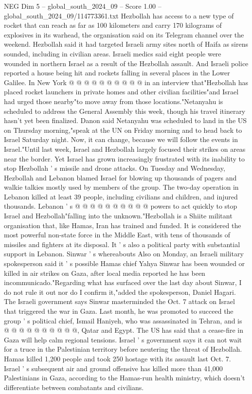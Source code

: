 \begin{textsample}{NEG Dim 5 – global\_south\_2024\_09 – Score 1.00 – global\_south\_2024\_09/114773361.txt}
Hezbollah has access to a new type of rocket that can reach as far as 100 kilometers and carry 170 kilograms of explosives in its warhead, the organisation said on its Telegram channel over the weekend.
Hezbollah said it had targeted Israeli army sites north of Haifa as sirens sounded, including in civilian areas.
Israeli medics said eight people were wounded in northern Israel as a result of the Hezbollah assault.
And Israeli police reported a house being hit and rockets falling in several places in the Lower Galilee.
In New York @ @ @ @ @ @ @ @ @ @ in an interview that"Hezbollah has placed rocket launchers in private homes and other civilian facilities"and Israel had urged those nearby"to move away from those locations."Netanyahu is scheduled to address the General Assembly this week, though his travel itinerary hasn't yet been finalized.
Danon said Netanyahu was scheduled to land in the US on Thursday morning,"speak at the UN on Friday morning and to head back to Israel Saturday night.
Now, it can change, because we will follow the events in Israel."Until last week, Israel and Hezbollah largely focused their strikes on areas near the border.
Yet Israel has grown increasingly frustrated with its inability to stop Hezbollah ' s missile and drone attacks.
On Tuesday and Wednesday, Hezbollah and Lebanon blamed Israel for blowing up thousands of pagers and walkie talkies mostly used by members of the group.
The two-day operation in Lebanon killed at least 39 people, including civilians and children, and injured thousands.
Lebanon ' s @ @ @ @ @ @ @ @ @ @ powers to act quickly to stop Israel and Hezbollah"falling into the unknown."Hezbollah is a Shiite militant organisation that, like Hamas, Iran has trained and funded.
It is considered the most powerful non-state force in the Middle East, with tens of thousands of missiles and fighters at its disposal.
It ' s also a political party with substantial support in Lebanon.
Sinwar ' s whereabouts Also on Monday, an Israeli military spokesperson said it ' s possible Hamas chief Yahya Sinwar has been wounded or killed in air strikes on Gaza, after local media reported he has been incommunicado."Regarding what has surfaced over the last day about Sinwar, I do not rule it out nor do I confirm it,"added the spokesperson, Daniel Hagari.
The Israeli government says Sinwar masterminded the Oct. 7 attack on Israel that triggered the war in Gaza.
Last month, he was promoted to succeed the group ' s political chief, Ismail Haniyeh, who was assassinated in Tehran, and is @ @ @ @ @ @ @ @ @ @, Qatar and Egypt.
The US has said that a cease-fire in Gaza will help calm regional tensions.
Israel ' s government says it can not wait for a truce in the Palestinian territory before neutering the threat of Hezbollah.
Hamas killed 1,200 people and took 250 hostage with its assault last Oct. 7.
Israel ' s subsequent air and ground offensive has killed more than 41,000 Palestinians in Gaza, according to the Hamas-run health ministry, which doesn't differentiate between combatants and civilians.

\end{textsample}
